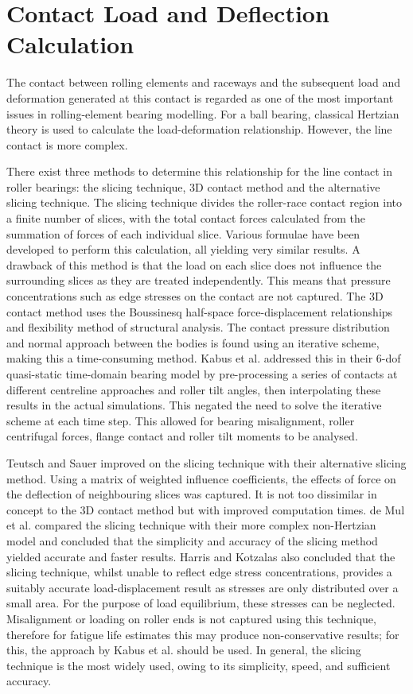 \section{Contact Load and Deflection Calculation}

The contact between rolling elements and raceways and the subsequent load and deformation generated at this contact is regarded as one of the most important issues in rolling-element bearing modelling. For a ball bearing, classical Hertzian theory is used to calculate the load-deformation relationship. However, the line contact is more complex.

There exist three methods to determine this relationship for the line contact in roller bearings: the slicing technique, 3D contact method and the alternative slicing technique. The slicing technique \cite{Andreason1973} divides the roller-race contact region into a finite number of slices, with the total contact forces calculated from the summation of forces of each individual slice. Various formulae have been developed to perform this calculation, all yielding very similar results. A drawback of this method is that the load on each slice does not influence the surrounding slices as they are treated independently. This means that pressure concentrations such as edge stresses on the contact are not captured. The 3D contact method uses the Boussinesq half-space force-displacement relationships and flexibility method of structural analysis. The contact pressure distribution and normal approach between the bodies is found using an iterative scheme, making this a time-consuming method. Kabus et al. \cite{Kabus2012} addressed this in their 6-dof quasi-static time-domain bearing model  by pre-processing a series of contacts at different centreline approaches  and roller tilt angles, then interpolating these results in the actual simulations. This negated the need to solve the iterative scheme at each time step. This allowed for bearing misalignment, roller centrifugal forces, flange contact and roller tilt moments to be analysed. 

Teutsch and Sauer \cite{Teutsch2004} improved on the slicing technique with their alternative slicing method. Using a matrix of weighted influence coefficients, the effects of force on the deflection of neighbouring slices was captured. It is not too dissimilar in concept to the 3D contact method but with improved computation times. de Mul et al. \cite{DeMul1989_2} compared the slicing technique with their more complex non-Hertzian model and concluded that the simplicity and accuracy of the slicing method yielded accurate and faster results. Harris and Kotzalas \cite{Harris2007} also concluded that the slicing technique, whilst unable to reflect edge stress concentrations, provides a suitably accurate load-displacement result as stresses are only distributed over a small area. For the purpose of load equilibrium, these stresses can be neglected. Misalignment or loading on roller ends is not captured using this technique, therefore for fatigue life estimates this may produce non-conservative results; for this, the approach by Kabus et al. should be used. In general, the slicing technique is the most widely used, owing to its simplicity, speed, and sufficient accuracy.

